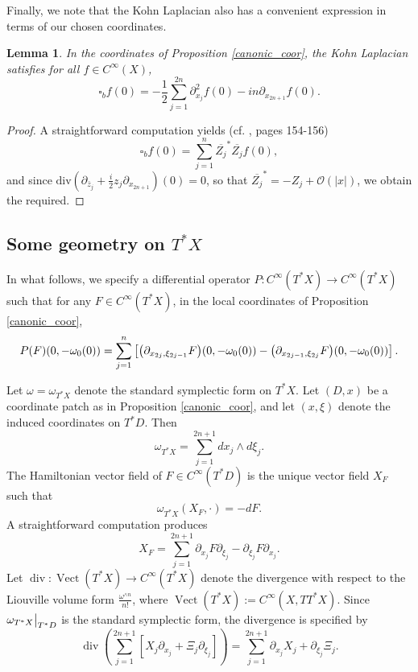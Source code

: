 \documentclass{article}
\newtheorem{lemma}[theorem]{Lemma}
\newcommand{\mco}{\mathcal O}
\DeclareMathOperator{\Div}{div}
\DeclareMathOperator{\Vect}{Vect}
\begin{document}
Finally, we note that the Kohn Laplacian also has a convenient expression in terms of our chosen coordinates.
%
\begin{lemma} In the coordinates of Proposition \ref{canonic_coor}, the Kohn Laplacian satisfies for all $f\in C^\infty(X)$, 
\begin{equation*} \square_bf(0) = -\frac 1 2\sum_{j=1}^{2n} \partial_{x_j}^2 f(0) -in \partial_{x_{2n+1}}f(0).\end{equation*} \end{lemma}
% 
\begin{proof}
A straightforward computation yields (cf. \cite{beals_greiner}, pages 154-156)
\begin{equation*} \square_bf(0) = \sum_{j=1}^n \overline{Z_j}^* \overline{Z_j} f(0),\end{equation*}
and since $\text{div}\left(\partial_{\bar z_j} +\frac i 2  z_j \partial_{x_{2n+1}}\right)(0)=0$, so that $\overline{Z_j}^* = - Z_j + \mco(|x|)$, we obtain the required. \end{proof}
%

\subsection{Some geometry on $T^*X$}\label{diffr_op_def}
%
In what follows, we specify a differential operator $P: C^\infty(T^*X) \to C^\infty(T^*X)$ such that for any $F \in C^\infty(T^*X)$, in the local coordinates of Proposition \ref{canonic_coor},
%
$$P(F)(0, -\omega_0(0)) = \sum_{j=1}^n \left[\big{(}\partial_{x_{2j}, \xi_{2j-1}} F\big{)}(0, -\omega_0(0)) - \big{(}\partial_{x_{2j-1}, \xi_{2j}} F \big{)}(0, -\omega_0(0))\right].$$

Let $\omega=\omega_{T^*X}$ denote the standard symplectic form on $T^*X$. Let $(D, x)$ be a coordinate patch as in Proposition \ref{canonic_coor}, and let $(x, \xi)$ denote the induced coordinates on $T^*D$. Then $$\omega_{T^*X} = \sum_{j=1}^{2n+1} dx_j \wedge d\xi_j.$$
The Hamiltonian vector field of $F \in C^\infty(T^*D)$ is the unique vector field $X_F$ such that $$\omega_{T^*X}(X_F, \cdot) = -dF.$$
A straightforward computation produces $$X_F = \sum_{j=1}^{2n+1}  \partial_{x_j} F \partial_{\xi_j}-\partial_{\xi_j} F \partial_{x_j} .$$
Let $\Div : \Vect(T^*X) \to C^\infty(T^*X)$ denote the divergence with respect to the Liouville volume form $\frac{\omega^{\wedge n}}{n!} $, where $\Vect(T^*X):=C^\infty(X,TT^*X)$. Since $\omega_{T^*X}\big{|}_{T^*D}$ is the standard symplectic form, the divergence is specified by $$\Div \left(\sum_{j=1}^{2n+1}\left[ X_j \partial_{x_j} + \Xi_j \partial_{\xi_j} \right]\right) = \sum_{j=1}^{2n+1} \partial_{x_j} X_j + \partial_{\xi_j} \Xi_j.$$
\end{document}
